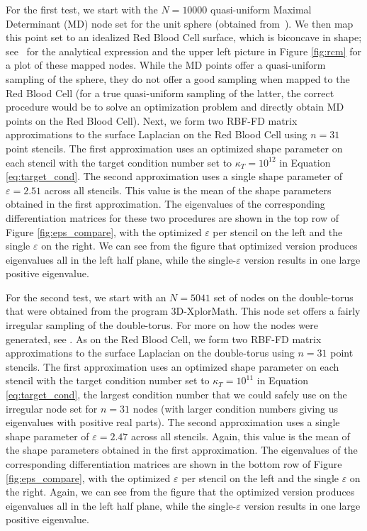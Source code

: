 \documentclass[smallextended]{svjour3}
\newcommand{\ep}{\varepsilon}
\begin{document}
For the first test, we start with the $N=10000$ quasi-uniform Maximal Determinant (MD) node set for the unit sphere (obtained from~\cite{WomerSloan:2003}). We then map this point set to an idealized Red Blood Cell surface, which is biconcave in shape; see~\cite[Appendix B]{FuselierWright2012} for the analytical expression and the upper left picture in Figure \ref{fig:rcm} for a plot of these mapped nodes.  While the MD points offer a quasi-uniform sampling of the sphere, they do not offer a good sampling when mapped to the Red Blood Cell (for a true quasi-uniform sampling of the latter, the correct procedure would be to solve an optimization problem and directly obtain MD points on the Red Blood Cell).  Next, we form two RBF-FD matrix approximations to the surface Laplacian on the Red Blood Cell using $n=31$ point stencils.  The first approximation uses an optimized shape parameter on each stencil with the target condition number set to $\kappa_T = 10^{12}$ in Equation \eqref{eq:target_cond}. The second approximation uses a single shape parameter of $\ep =  2.51$ across all stencils.  This value is the mean of the shape parameters obtained in the first approximation.  The eigenvalues of the corresponding differentiation matrices for these two procedures are shown in the top row of Figure \ref{fig:eps_compare}, with the optimized $\ep$ per stencil on the left and the single $\ep$ on the right.  We can see from the figure that optimized version produces eigenvalues all in the left half plane, while the single-$\ep$ version results in one large positive eigenvalue.

For the second test, we start with an $N=5041$ set of nodes on the double-torus that were obtained from the program 3D-XplorMath. This node set offers a fairly irregular sampling of the double-torus. For more on how the nodes were generated, see \cite{FuselierWright2012}. As on the Red Blood Cell, we form two RBF-FD matrix approximations to the surface Laplacian on the double-torus using $n=31$ point stencils. The first approximation uses an optimized shape parameter on each stencil with the target condition number set to $\kappa_T = 10^{11}$ in Equation \eqref{eq:target_cond}, the largest condition number that we could safely use on the irregular node set for $n = 31$ nodes (with larger condition numbers giving us eigenvalues with positive real parts). The second approximation uses a single shape parameter of $\ep = 2.47$ across all stencils. Again, this value is the mean of the shape parameters obtained in the first approximation. The eigenvalues of the corresponding differentiation matrices are shown in the bottom row of Figure \ref{fig:eps_compare}, with the optimized $\ep$ per stencil on the left and the single $\ep$ on the right. Again, we can see from the figure that the optimized version produces eigenvalues all in the left half plane, while the single-$\ep$ version results in one large positive eigenvalue.
\end{document}
